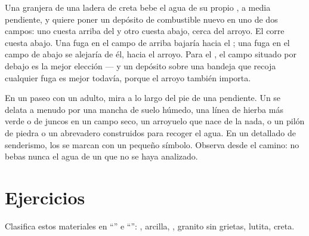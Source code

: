 \begin{example}\label{ex:g6:water-underground:tank}
Una granjera de una ladera de creta bebe el agua de su propio , a media
pendiente, y quiere poner un depósito de combustible nuevo en uno de dos
campos: uno cuesta arriba del  y otro cuesta abajo, cerca del arroyo.
El  corre cuesta abajo. Una fuga en el campo de arriba
bajaría hacia el ; una fuga en el campo de abajo se alejaría de él,
hacia el arroyo. Para el , el campo situado por debajo es la mejor
elección
--- y un depósito sobre una bandeja que recoja cualquier fuga es mejor
todavía, porque el arroyo también importa.
\end{example}

\begin{inthefield}
En un paseo con un adulto, mira a lo largo del pie de una pendiente. Un
 se delata a menudo por una mancha de suelo húmedo, una línea de
hierba más verde o de juncos en un campo seco, un arroyuelo que nace de la
nada, o un pilón de piedra o un abrevadero construidos para recoger el
agua. En un  detallado de senderismo, los  se marcan con un
pequeño símbolo. Observa desde el camino: no bebas nunca el agua de un
 que no se haya analizado.
\end{inthefield}

\section{Ejercicios}

\begin{exercise}[$\star$]\label{exo:g6:water-underground:1}
Clasifica estos materiales en ``'' e ``'': ,
arcilla, , granito sin grietas, lutita, creta.
\end{exercise}

